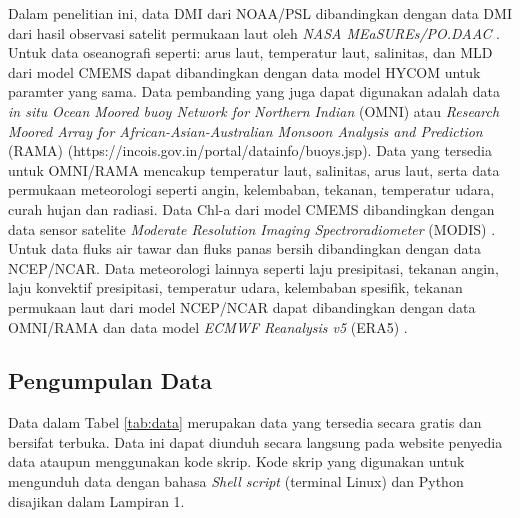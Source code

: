 \begin{spacing}{1.5}
	Dalam penelitian ini, data DMI dari NOAA/PSL dibandingkan dengan data DMI dari hasil observasi satelit permukaan laut oleh \textit{NASA MEaSUREs/PO.DAAC} \cite{kumar202020th}. Untuk data oseanografi seperti: arus laut, temperatur laut, salinitas, dan MLD dari model CMEMS dapat dibandingkan dengan data model HYCOM untuk paramter yang sama. Data pembanding yang juga dapat digunakan adalah data \textit{in situ} \textit{Ocean Moored buoy Network for Northern Indian} (OMNI) atau \textit{Research Moored Array for African-Asian-Australian Monsoon Analysis and Prediction} (RAMA) (https://incois.gov.in/portal/datainfo/buoys.jsp). Data yang tersedia untuk OMNI/RAMA mencakup temperatur laut, salinitas, arus laut, serta data permukaan meteorologi seperti angin, kelembaban, tekanan, temperatur udara, curah hujan dan radiasi. Data Chl-a dari model CMEMS dibandingkan dengan data sensor satelite \textit{Moderate Resolution Imaging Spectroradiometer} (MODIS) \cite{pagano1993moderate}. Untuk data fluks air tawar dan fluks panas bersih dibandingkan dengan data NCEP/NCAR. Data meteorologi lainnya seperti laju presipitasi, tekanan angin, laju konvektif presipitasi, temperatur udara, kelembaban spesifik, tekanan permukaan laut dari model NCEP/NCAR dapat dibandingkan dengan data OMNI/RAMA dan data model \textit{ECMWF Reanalysis v5} (ERA5) \cite{hersbach2020era5}.
	
	\subsection[Pengumpulan Data]{Pengumpulan Data}
	Data dalam Tabel \ref{tab:data} merupakan data yang tersedia secara gratis dan bersifat terbuka. Data ini dapat diunduh secara langsung pada website penyedia data ataupun menggunakan kode skrip. Kode skrip yang digunakan untuk mengunduh data dengan bahasa \textit{Shell script} (terminal Linux) dan Python disajikan dalam Lampiran 1.
	

\end{spacing}
